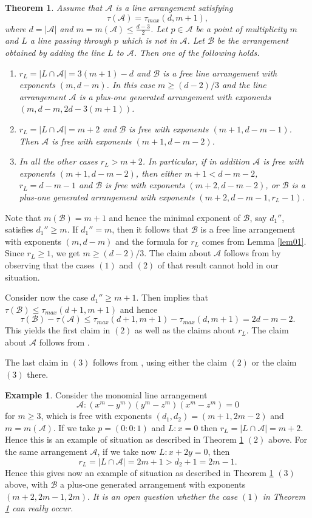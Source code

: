 \documentclass[12pt]{amsart}
\theoremstyle{plain}
\newtheorem{thm}[subsection]{Theorem}
\theoremstyle{definition}
\newtheorem{ex}[subsection]{Example}
\numberwithin{equation}{section}
\newcommand{\A}{{\mathcal A}}
\newcommand{\B}{{\mathcal B}}
\begin{document}
  \begin{thm}
\label{thm03}
Assume that $\A$ is a line arrangement satisfying
$$\tau(\A)=\tau_{max}(d,m+1),$$
where $d=|\A|$ and $m=m(\A)\leq \frac{d-3}{2}$. Let $p \in \A$ be a point of multiplicity $m$ and $L$ a line passing through $p$ which is not in $\A$. Let $\B$ be the arrangement obtained by adding the line $L$ to $\A$. Then one of the following holds.
\begin{enumerate} 

\item $r_L=|L \cap \A|=3(m+1)-d$ and $\B$ is a free line arrangement with exponents $(m,d-m)$. In this case $m \geq (d-2)/3$ and the line arrangement $\A$ is a plus-one generated arrangement with exponents $(m,d-m,2d-3(m+1))$.

\item $r_L=|L \cap \A|=m+2$
and  $\B$ is free with exponents $(m+1,d-m-1)$. Then $\A$ is free with exponents $(m+1,d-m-2)$.

\item In all the other cases $r_L >m+2$. In particular, if in addition $\A$ is free with exponents $(m+1,d-m-2)$, then 
either $m+1<d-m-2$, $r_L=d-m-1$ and $\B$ is free with exponents $(m+2,d-m-2)$, or
$\B$ is a plus-one generated arrangement  with exponents $(m+2,d-m-1, r_L-1)$.

\end{enumerate} 
\end{thm}

\proof
Note that $m(\B)=m+1$ and hence the minimal exponent of $\B$, say
$d_1''$, satisfies $d_1'' \geq m$. If $d_1''=m$, then it follows that $\B$ 
is a free line arrangement with exponents $(m,d-m)$ and the formula for $r_L$ comes from Lemma \ref{lem01}. Since $r_L \geq 1$, we get 
$m \geq (d-2)/3$. The claim about $\A$ follows from  \cite[Theorem 1.3 (3)]{POG} by observing that the cases $(1)$ and $(2)$ of that result cannot hold in our situation. 

Consider now the case $d_1'' \geq m+1$. Then \cite{dPCTC} implies that
$\tau(\B) \leq \tau_{max}(d+1,m+1)$ and hence
$$\tau(\B)-\tau(\A) \leq  \tau_{max}(d+1,m+1)- \tau_{max}(d,m+1)=2d-m-2.$$
This yields the first claim in $(2)$ as well as the claims about $r_L$.
The claim about $\A$ follows from  \cite[Theorem 1.3 (1)]{POG}.

The last claim in $(3)$ follows from  \cite[Theorem 1.4]{POG}, using either the claim $(2)$ or the claim $(3)$ there.
\endproof

 \begin{ex}
\label{ex03}
Consider the monomial line arrangement
$$\A: (x^m-y^m)(y^m-z^m)(x^m-z^m)=0$$
for $m \geq 3$, which is free with exponents $(d_1,d_2)=(m+1,2m-2)$ and $m=m(\A)$. If we take $p=(0:0:1)$ and $L:x=0$ then $r_L=|L \cap \A |=m+2$. Hence this is an example of situation as described in Theorem \ref{thm03} $(2)$ above.
For the same arrangement $\A$, if we take now $L: x+2y=0$, then
$$r_L=|L \cap \A |=2m+1>d_2+1=2m-1.$$
Hence this gives now an example of situation as described in Theorem \ref{thm03} $(3)$ above, with $\B$ a plus-one generated arrangement with exponents
$(m+2,2m-1,2m)$.
{\it It is an open question whether the case $(1)$ in Theorem \ref{thm03} can really occur.}
 \end{ex}
 
\end{document}
